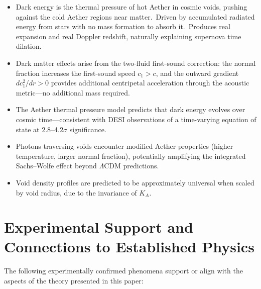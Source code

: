﻿\documentclass[12pt,letterpaper]{article}
\newcommand{\Ka}{K_{\!A}}
\begin{document}
\begin{itemize}[leftmargin=2em]
  \item Dark energy is the thermal pressure of hot Aether in cosmic voids,
    pushing against the cold Aether regions near matter.\ Driven by
    accumulated radiated energy from stars with no mass formation to absorb it.\ Produces
    real expansion and real Doppler redshift, naturally explaining supernova time dilation.
  \item Dark matter effects arise from the two-fluid first-sound correction: the
    normal fraction increases the first-sound speed $c_1 > c$, and the outward gradient
    $dc_1^2/dr > 0$ provides additional centripetal acceleration through the acoustic
    metric---no additional mass required.
  \item The Aether thermal pressure model predicts that dark energy evolves
    over cosmic time---consistent with DESI observations of a time-varying
    equation of state at 2.8--4.2$\sigma$ significance.
  \item Photons traversing voids encounter modified Aether properties
    (higher temperature, larger normal fraction), potentially amplifying
    the integrated Sachs--Wolfe effect beyond $\Lambda$CDM predictions.
  \item Void density profiles are predicted to be approximately universal
    when scaled by void radius, due to the invariance of $\Ka$.
\end{itemize}




\section{Experimental Support and Connections to Established Physics}

The following experimentally confirmed phenomena support or align with the aspects of the theory presented in this paper:
\end{document}
